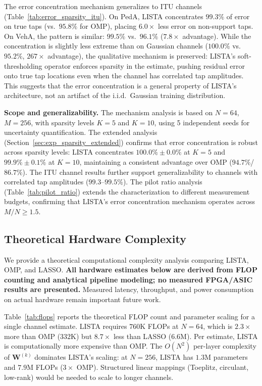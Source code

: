 \documentclass[a4paper,fleqn]{cas-sc}
\begin{document}
The error concentration mechanism generalizes to ITU channels (Table~\ref{tab:error_sparsity_itu}). On PedA, LISTA concentrates $99.3\%$ of error on true taps (vs.~$95.8\%$ for OMP), placing $6.0\times$ less error on non-support taps. On VehA, the pattern is similar: $99.5\%$ vs.~$96.1\%$ ($7.8\times$ advantage). While the concentration is slightly less extreme than on Gaussian channels ($100.0\%$ vs.~$95.2\%$, $267\times$ advantage), the qualitative mechanism is preserved: LISTA's soft-thresholding operator enforces sparsity in the estimate, pushing residual error onto true tap locations even when the channel has correlated tap amplitudes. This suggests that the error concentration is a general property of LISTA's architecture, not an artifact of the i.i.d.~Gaussian training distribution.

\textbf{Scope and generalizability.} The mechanism analysis is based on $N=64$, $M=256$, with sparsity levels $K=5$ and $K=10$, using 5 independent seeds for uncertainty quantification. The extended analysis (Section~\ref{sec:exp_sparsity_extended}) confirms that error concentration is robust across sparsity levels: LISTA concentrates $100.0\% \pm 0.0\%$ at $K=5$ and $99.9\% \pm 0.1\%$ at $K=10$, maintaining a consistent advantage over OMP ($94.7\%$/$86.7\%$). The ITU channel results further support generalizability to channels with correlated tap amplitudes ($99.3$--$99.5\%$). The pilot ratio analysis (Table~\ref{tab:pilot_ratio}) extends the characterization to different measurement budgets, confirming that LISTA's error concentration mechanism operates across $M/N \geq 1.5$.

\subsection{Theoretical Hardware Complexity}\label{sec:exp_hardware}

We provide a theoretical computational complexity analysis comparing LISTA, OMP, and LASSO. \textbf{All hardware estimates below are derived from FLOP counting and analytical pipeline modeling; no measured FPGA/ASIC results are presented.} Measured latency, throughput, and power consumption on actual hardware remain important future work.

Table~\ref{tab:flops} reports the theoretical FLOP count and parameter scaling for a single channel estimate. LISTA requires $760$K FLOPs at $N=64$, which is $2.3\times$ more than OMP ($332$K) but $8.7\times$ less than LASSO ($6.6$M). Per estimate, LISTA is computationally more expensive than OMP. The $O(N^2)$ per-layer complexity of $\mathbf{W}^{(k)}$ dominates LISTA's scaling: at $N=256$, LISTA has $1.3$M parameters and $7.9$M FLOPs ($3\times$ OMP). Structured linear mappings (Toeplitz, circulant, low-rank) would be needed to scale to longer channels.
\end{document}
